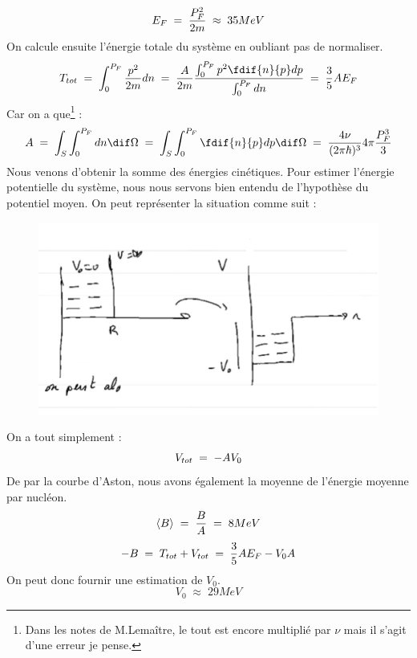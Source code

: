 \begin{equation*}
    E_F\; = \; \dfrac{P_F^2}{2m}  \; \approx \; 35MeV
\end{equation*}
On calcule ensuite l'énergie totale du système en oubliant pas de normaliser.
\begin{equation*}
    T_{tot}\eq \int_0^{P_F} \dfrac{p^2}{2m}dn 
    \eq \dfrac{A}{2m} \dfrac{\int_0^{P_F} p^2 \fdif{n}{p}dp}{\int_0^{P_F}dn}
    \eq \dfrac{3}{5} A E_F
\end{equation*}
Car on a que\footnote{Dans les notes de M.Lemaître, le tout est encore multiplié par $\nu$ mais il s'agit d'une erreur je pense.} :
\begin{equation*}
    A \eq \int_S\int_0^{P_F}dn \dif\Omega \eq \int_S\int_0^{P_F}\fdif{n}{p} dp\dif\Omega \eq \dfrac{4\nu}{(2\pi\hbar)^3} 4\pi \dfrac{P_F^3}{3}
\end{equation*}
Nous venons d'obtenir la somme des énergies cinétiques. Pour estimer l'énergie potentielle du système, nous nous servons bien entendu de l'hypothèse du potentiel moyen. On peut représenter la situation comme suit :
\begin{figure}
    \centering
    \includegraphics{Images4/puits2.PNG}
\end{figure}
On a tout simplement :
\begin{equation*}
    V_{tot} \; = \; -A V_0
\end{equation*}
De par la courbe d'Aston, nous avons également la moyenne de l'énergie moyenne par nucléon.
\begin{equation*}
    \expval{B} \; = \; \dfrac{B}{A} \; = \; 8MeV
\end{equation*}
\begin{equation*}
    -B \; = \; T_{tot} + V_{tot} \; = \; \dfrac{3}{5}A E_F - V_0 A
\end{equation*}
On peut donc fournir une estimation de $V_0$.
\begin{equation*}
    V_0 \; \approx \; 29MeV
\end{equation*}

